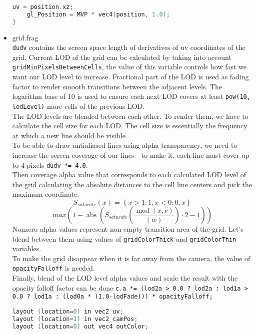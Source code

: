 \begin{itemize}
\begin{lstlisting}[language=c++, caption=Grid vertex shader (./assets/shaders/grid.vert)]
    uv = position.xz;
    gl_Position = MVP * vec4(position, 1.0);
}
\end{lstlisting}
    \item grid.frag\\
    \texttt{dudv} contains the screen space length of derivatives of uv coordinates of the grid. Current LOD of the grid can be calculated by taking into account \texttt{gridMinPixelsBetweenCells}, the value of this variable controls how fast we want our LOD level to increase. Fractional part of the LOD is used as fading factor to render smooth transitions between the adjacent levels. The logarithm base of 10 is used to ensure each next LOD covers at least \texttt{pow(10, lodLevel)} more cells of the previous LOD.\\
    The LOD levels are blended between each other. To render them, we have to calculate the cell size for each LOD. The cell size is essentially the frequency at which a new line should be visible.\\
    To be able to draw antialiased lines using alpha transparency, we need to increase the screen coverage of our lines - to make it, each line must cover up to 4 pixels \texttt{dudv *= 4.0}.\\
    Then coverage alpha value that corresponds to each calculated LOD level of the grid calculating the absolute distances to the cell line centers and pick the maximum coordinate.\\
\begin{equation}
S_{saturate}\left(x\right)=\left\{x>1:1,x<0:0,x\right\}
\end{equation}
\begin{equation}
max\left(1-\operatorname{abs}\left(S_{saturate}\left(\frac{\operatorname{mod}\left(x,c\right)}{\left(w\right)}\right)\cdot2-1\right)\right)
\end{equation}
    Nonzero alpha values represent non-empty transition area of the grid. Let's blend between them using values of \texttt{gridColorThick} and \texttt{gridColorThin} variables.\\
    To make the grid disappear when it is far away from the camera, the value of \texttt{opacityFalloff} is needed.\\
    Finally, blend of the LOD level alpha values and scale the result with the opacity falloff factor can be done \texttt{c.a *= (lod2a > 0.0 ? lod2a : lod1a > 0.0 ? lod1a : (lod0a * (1.0-lodFade))) * opacityFalloff;}
\begin{lstlisting}[language=c++, caption=Grid fragment shader (./assets/shaders/grid.frag)]
layout (location=0) in vec2 uv;
layout (location=1) in vec2 camPos;
layout (location=0) out vec4 outColor;


\end{lstlisting}
\end{itemize}
